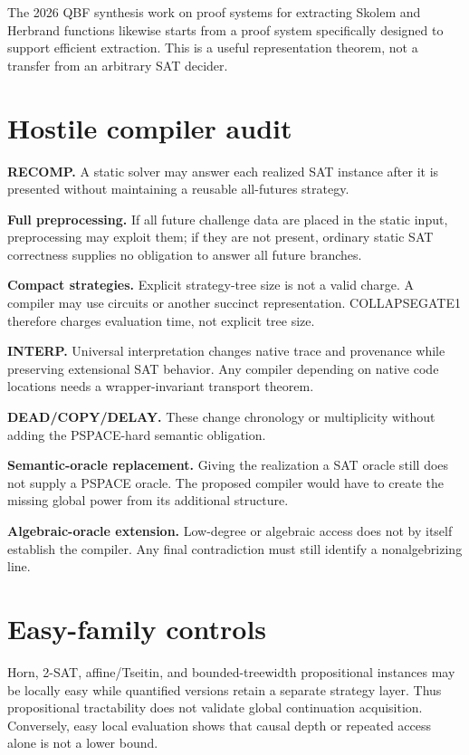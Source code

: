 \documentclass[11pt]{article}
\begin{document}
The 2026 QBF synthesis work on proof systems for extracting Skolem and Herbrand functions likewise starts from a proof system specifically designed to support efficient extraction. This is a useful representation theorem, not a transfer from an arbitrary SAT decider.

\section*{Hostile compiler audit}
\textbf{RECOMP.} A static solver may answer each realized SAT instance after it is presented without maintaining a reusable all-futures strategy.

\textbf{Full preprocessing.} If all future challenge data are placed in the static input, preprocessing may exploit them; if they are not present, ordinary static SAT correctness supplies no obligation to answer all future branches.

\textbf{Compact strategies.} Explicit strategy-tree size is not a valid charge. A compiler may use circuits or another succinct representation. COLLAPSEGATE1 therefore charges evaluation time, not explicit tree size.

\textbf{INTERP.} Universal interpretation changes native trace and provenance while preserving extensional SAT behavior. Any compiler depending on native code locations needs a wrapper-invariant transport theorem.

\textbf{DEAD/COPY/DELAY.} These change chronology or multiplicity without adding the PSPACE-hard semantic obligation.

\textbf{Semantic-oracle replacement.} Giving the realization a SAT oracle still does not supply a PSPACE oracle. The proposed compiler would have to create the missing global power from its additional structure.

\textbf{Algebraic-oracle extension.} Low-degree or algebraic access does not by itself establish the compiler. Any final contradiction must still identify a nonalgebrizing line.

\section*{Easy-family controls}
Horn, 2-SAT, affine/Tseitin, and bounded-treewidth propositional instances may be locally easy while quantified versions retain a separate strategy layer. Thus propositional tractability does not validate global continuation acquisition. Conversely, easy local evaluation shows that causal depth or repeated access alone is not a lower bound.
\end{document}
